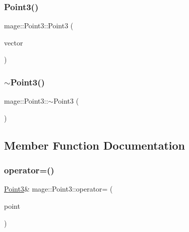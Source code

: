 \hypertarget{structmage_1_1_point3_a84b8c62ed63301fde1ce0e045c12352b}{}\label{structmage_1_1_point3_a84b8c62ed63301fde1ce0e045c12352b} 
\subsubsection{\texorpdfstring{Point3()}{Point3()}\hspace{0.1cm}{\footnotesize\ttfamily [10/10]}}
{\footnotesize\ttfamily mage\+::\+Point3\+::\+Point3 (\begin{DoxyParamCaption}\item[{X\+M\+F\+L\+O\+A\+T3 \&\&}]{vector }\end{DoxyParamCaption})\hspace{0.3cm}{\ttfamily [explicit]}}

\hypertarget{structmage_1_1_point3_a952151b6ff72b68569f95445c2ac2495}{}\label{structmage_1_1_point3_a952151b6ff72b68569f95445c2ac2495} 
\subsubsection{\texorpdfstring{$\sim$\+Point3()}{~Point3()}}
{\footnotesize\ttfamily mage\+::\+Point3\+::$\sim$\+Point3 (\begin{DoxyParamCaption}{ }\end{DoxyParamCaption})\hspace{0.3cm}{\ttfamily [default]}}



\subsection{Member Function Documentation}
\hypertarget{structmage_1_1_point3_a53403b16c67a6c7d72910edaec04e371}{}\label{structmage_1_1_point3_a53403b16c67a6c7d72910edaec04e371} 
\subsubsection{\texorpdfstring{operator=()}{operator=()}\hspace{0.1cm}{\footnotesize\ttfamily [1/2]}}
{\footnotesize\ttfamily \hyperlink{structmage_1_1_point3}{Point3}\& mage\+::\+Point3\+::operator= (\begin{DoxyParamCaption}\item[{const \hyperlink{structmage_1_1_point3}{Point3} \&}]{point }\end{DoxyParamCaption})}

